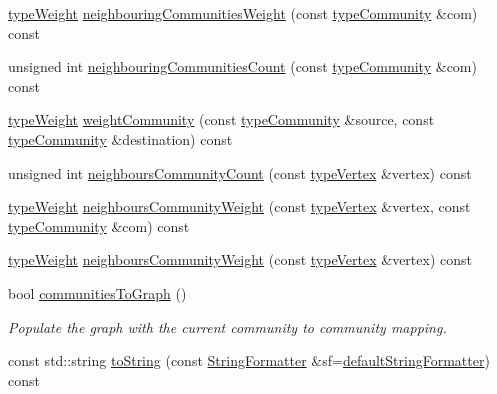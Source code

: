 \begin{DoxyCompactItemize}
\item 
\hyperlink{edge_8h_a2e7ea3be891ac8b52f749ec73fee6dd2}{type\+Weight} \hyperlink{classGraphUndirectedGroupable_ae8d5d8cea2c1dfba0b4e7110100f2973}{neighbouring\+Communities\+Weight} (const \hyperlink{graphUndirectedGroupable_8h_a914da95c9ea7f14f4b7f875c36818556}{type\+Community} \&com) const
\item 
unsigned int \hyperlink{classGraphUndirectedGroupable_aaf488071a0e3b6cf96b29ae1af8df02f}{neighbouring\+Communities\+Count} (const \hyperlink{graphUndirectedGroupable_8h_a914da95c9ea7f14f4b7f875c36818556}{type\+Community} \&com) const
\item 
\hyperlink{edge_8h_a2e7ea3be891ac8b52f749ec73fee6dd2}{type\+Weight} \hyperlink{classGraphUndirectedGroupable_a2884361f00176ac8f16afca6feb3e404}{weight\+Community} (const \hyperlink{graphUndirectedGroupable_8h_a914da95c9ea7f14f4b7f875c36818556}{type\+Community} \&source, const \hyperlink{graphUndirectedGroupable_8h_a914da95c9ea7f14f4b7f875c36818556}{type\+Community} \&destination) const
\item 
unsigned int \hyperlink{classGraphUndirectedGroupable_ae70ef901c94e0d117abbaa5cd64a63e6}{neighbours\+Community\+Count} (const \hyperlink{edge_8h_a5fbd20c46956d479cb10afc9855223f6}{type\+Vertex} \&vertex) const
\item 
\hyperlink{edge_8h_a2e7ea3be891ac8b52f749ec73fee6dd2}{type\+Weight} \hyperlink{classGraphUndirectedGroupable_a23551b49c2cbf1b533e300af5c1f20da}{neighbours\+Community\+Weight} (const \hyperlink{edge_8h_a5fbd20c46956d479cb10afc9855223f6}{type\+Vertex} \&vertex, const \hyperlink{graphUndirectedGroupable_8h_a914da95c9ea7f14f4b7f875c36818556}{type\+Community} \&com) const
\item 
\hyperlink{edge_8h_a2e7ea3be891ac8b52f749ec73fee6dd2}{type\+Weight} \hyperlink{classGraphUndirectedGroupable_a41c4955a6238924a861fe18e8d7a9ee9}{neighbours\+Community\+Weight} (const \hyperlink{edge_8h_a5fbd20c46956d479cb10afc9855223f6}{type\+Vertex} \&vertex) const
\item 
bool \hyperlink{classGraphUndirectedGroupable_af6fc2c9e8aad7c6bce37d30eeaf184a8}{communities\+To\+Graph} ()
\begin{DoxyCompactList}\small\item\em Populate the graph with the current community to community mapping. \end{DoxyCompactList}\item 
const std\+::string \hyperlink{classGraphUndirectedGroupable_a615f30036acfdd33e45b82dc47e7d174}{to\+String} (const \hyperlink{classStringFormatter}{String\+Formatter} \&sf=\hyperlink{stringFormatter_8h_abf1349c8e24162d0134072aff288f2a2}{default\+String\+Formatter}) const
\end{DoxyCompactItemize}
